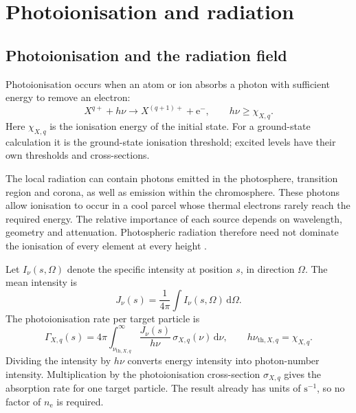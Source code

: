 \documentclass[a4paper,10pt,twoside,openany]{book}
\newcommand{\ChapColor}{Cap1Blue}
\newcommand{\ChapColorLight}{LightBlue}
\newcommand{\setChapColor}[2]{%
  \renewcommand{\ChapColor}{#1}%
  \renewcommand{\ChapColorLight}{#2}}
\begin{document}
\setChapColor{Cap2Orange}{LightOrange}
\chapter{Photoionisation and radiation}

\section{Photoionisation and the radiation field}
\label{subsec:photoionisation}

Photoionisation occurs when an atom or ion absorbs a photon with sufficient
energy to remove an electron:
\begin{equation}
 X^{q+}+h\nu
 \longrightarrow X^{(q+1)+}+\mathrm e^-,
 \qquad h\nu\geq\chi_{X,q}.
 \label{eq:ion_photo_reaction}
\end{equation}
Here \(\chi_{X,q}\) is the ionisation energy of the initial state.
For a ground-state calculation it is the ground-state ionisation threshold;
excited levels have their own thresholds and cross-sections.

The local radiation can contain photons emitted in the photosphere,
transition region and corona, as well as emission within the chromosphere.
These photons allow ionisation to occur in a cool parcel whose thermal
electrons rarely reach the required energy. The relative importance of each
source depends on wavelength, geometry and attenuation. Photospheric radiation
therefore need not dominate the ionisation of every element at every height
\cite{laming2015,dufresne2021}.

Let \(I_\nu(s,\Omega)\) denote the specific intensity at position \(s\), in
direction \(\Omega\). The mean intensity is
\begin{equation}
 J_\nu(s)=\frac{1}{4\pi}\int I_\nu(s,\Omega)\,\mathrm d\Omega.
 \label{eq:ion_mean_intensity}
\end{equation}
The photoionisation rate per target particle is
\begin{equation}
 \Gamma_{X,q}(s)
 =4\pi\int_{\nu_{\mathrm{th},X,q}}^\infty
 \frac{J_\nu(s)}{h\nu}\,
 \sigma_{X,q}(\nu)\,\mathrm d\nu,
 \qquad
 h\nu_{\mathrm{th},X,q}=\chi_{X,q}.
 \label{eq:ion_photo_frequency}
\end{equation}
Dividing the intensity by \(h\nu\) converts energy intensity into photon-number
intensity. Multiplication by the photoionisation cross-section
\(\sigma_{X,q}\) gives the absorption rate for one target particle.
The result already has units of \(\mathrm{s^{-1}}\), so no factor of
\(n_{\mathrm e}\) is required.
\end{document}
